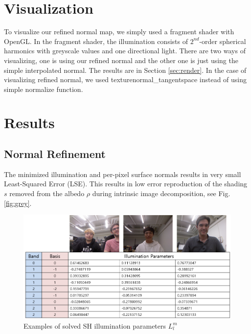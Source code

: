 \documentclass[10pt,twocolumn,letterpaper]{article}
\begin{document}
\section{Visualization}
To visualize our refined normal map, we simply used a fragment shader with OpenGL. In the fragment shader, the illumination consists of $2^{nd}$-order spherical harmonics with greyscale values and one directional light. There are two ways of visualizing, one is using our refined normal and the other one is just using the simple interpolated normal.  The results are in Section \ref{sec:render}. In the case of visualizing refined normal, we used texturenormal\_tangentspace instead of using simple normalize function. 

\section{Results}
\subsection{Normal Refinement}
The minimized illumination and per-pixel surface normals results in very small Least-Squared Error (LSE). This results in low error reproduction of the shading $s$ removed from the albedo $\rho$ during intrinsic image decomposition, see Fig. \ref{fig:grey}. 


\begin{figure}[!h]
    \begin{center}
        \includegraphics [scale=0.33] {image/illum.png}
    \end{center}
    \caption{Examples of solved SH illumination parameters $L_l^m$}
    \label{fig:result-illum}
\end{figure} 
\end{document}
